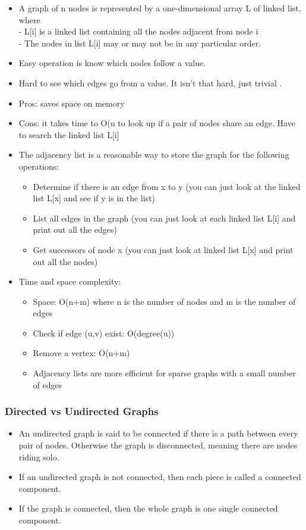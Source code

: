 \documentclass[10pt]{article}
\begin{document}
\begin{itemize}
    \item A graph of n nodes is represented by a one-dimensional array L of linked list, where\\
          - L[i] is a linked list containing all the nodes adjacent from node i\\
          - The nodes in list L[i] may or may not be in any particular order.
    \item Easy operation is know which nodes follow a value.
    \item Hard to see which edges go from a value. It isn't that hard, just trivial .
    \item Pros: saves space on memory
    \item Cons: it takes time to O(n to look up if a pair of nodes share an edge. Have to search the linked list L[i]
    \item The adjacency list is a reasonable way to store the graph for the following operations:
          \begin{itemize}
              \item Determine if there is an edge from x to y (you can just look at the linked list L[x] and see if y is in the list)
              \item List all edges in the graph (you can just look at each linked list L[i] and print out all the edges)
              \item Get successors of node x (you can just look at linked list L[x] and print out all the nodes)
          \end{itemize}
    \item Time and space complexity:
          \begin{itemize}
              \item Space: O(n+m) where n is the number of nodes and m is the number of edges
              \item Check if edge (u,v) exist: O(degree(u))
              \item Remove a vertex: O(n+m)
              \item Adjacency lists are more efficient for sparse graphs with a small number of edges
          \end{itemize}
\end{itemize}

\subsubsection{Directed vs Undirected Graphs}
\begin{itemize}
    \item An undirected graph is said to be connected if there is a path between every pair of nodes. Otherwise the graph is disconnected, meaning there are nodes riding solo.
    \item If an undirected graph is not connected, then each piece is called a connected component.
    \item If the graph is connected, then the whole graph is one single connected component.
\end{itemize}
\end{document}
